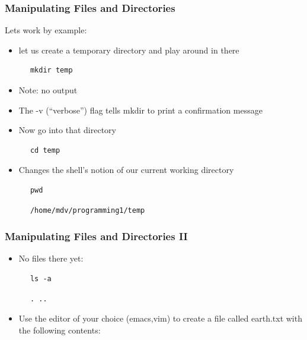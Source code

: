 \begin{frame}[fragile]\frametitle{Manipulating Files and Directories}
Lets work by example:
\begin{itemize}
\item let us create a temporary directory and play around in there
\end{itemize}
\codelist
\begin{lstlisting}
      mkdir temp
\end{lstlisting}
\begin{itemize}
    \item Note: no output
    \item The -v (“verbose”) flag tells mkdir to print a confirmation message
\item Now go into that directory
\end{itemize}
\begin{lstlisting}
      cd temp
\end{lstlisting}
\begin{itemize}
\item Changes the shell's notion of our current working directory
\end{itemize}
\begin{lstlisting}
      pwd
\end{lstlisting}
\reslist
\begin{lstlisting}
      /home/mdv/programming1/temp
\end{lstlisting}
\end{frame}

\begin{frame}[fragile]\frametitle{Manipulating Files and Directories II}
\begin{itemize}
\item No files there yet:
\end{itemize}
\codelist
\begin{lstlisting}
      ls -a
\end{lstlisting}
\reslist
\begin{lstlisting}
      . ..
\end{lstlisting}
\begin{itemize}
\item Use the editor of your choice (emacs,vim) to create a file called earth.txt with the following contents:
\codesmall
{}
\end{itemize}
\end{frame}

